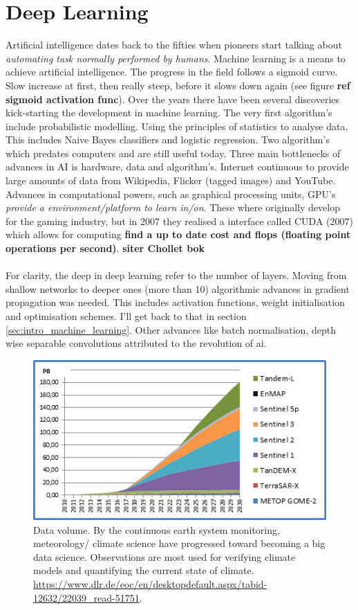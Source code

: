 \section{Deep Learning} \label{sec:intro_deep_learning}
Artificial intelligence dates back to the fifties when pioneers start talking about \textit{automating task normally performed by humans}. Machine learning is a means to achieve artificial intelligence. The progress in the field follows a sigmoid curve. Slow increase at first, then really steep, before it slows down again (see figure \textbf{ref sigmoid activation func}). Over the years there have been several discoveries kick-starting the development in machine learning. The very first algorithm's include probabilistic modelling. Using the principles of statistics to analyse data. This includes Naive Bayes classifiers and logistic regression. Two algorithm's which predates computers and are still useful today. Three main bottlenecks of advances in AI is hardware, data and algorithm's. Internet continuous to provide large amounts of data from Wikipedia, Flicker (tagged images) and YouTube. Advances in computational powers, such as graphical processing units, GPU's \textit{provide a environment/platform to learn in/on}. These where originally develop for the gaming industry, but in 2007 they realised a interface called CUDA (2007) which allows for computing \textbf{find a up to date cost and flops (floating point operations per second)}. \textbf{siter Chollet bok}
\\ \\ 
For clarity, the deep in deep learning refer to the number of layers. Moving from shallow networks to deeper ones (more than 10) algorithmic advances in gradient propagation was needed. This includes activation functions, weight initialisation and optimisation schemes. I'll get back to that in section \ref{sec:intro_machine_learning}. Other advances like batch normalisation, depth wise separable convolutions attributed to the revolution of \acrshort{ai}. 
\begin{figure}[h]
    \centering
    \includegraphics{Chapter1_Intro/images/Datenvolumen_D-SDA.jpg}
    \caption{Data volume. By the continuous earth system monitoring, meteorology/ climate science have progressed toward becoming a big data science. Observations are most used for verifying climate models and quantifying the current state of climate. \href{https://www.dlr.de/eoc/en/desktopdefault.aspx/tabid-12632/22039_read-51751}{https://www.dlr.de/eoc/en/desktopdefault.aspx/tabid-12632/22039{\_}read-51751}.}
    \label{fig:data_volum_sat}
\end{figure}
